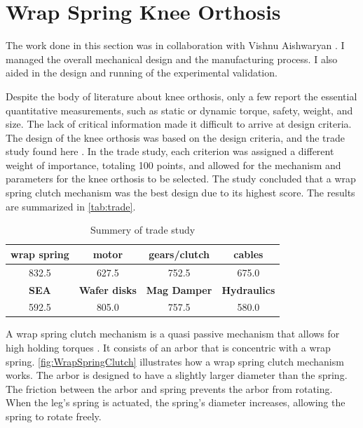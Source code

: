 
\section{Wrap Spring Knee Orthosis}
\label{sec:knee}

The work done in this section was in collaboration with  Vishnu Aishwaryan \cite{mani2020design}. I managed the overall mechanical design and the manufacturing process. I also aided in the design and running of the experimental validation.

Despite the body of literature about knee orthosis, only a few report the essential quantitative measurements, such as static or dynamic torque, safety, weight, and size. The lack of critical information made it difficult to arrive at design criteria. The design of the knee orthosis was based on the design criteria, and the trade study found here \cite{subra2020design}. In the trade study, each criterion was assigned a different weight of importance, totaling 100 points, and allowed for the mechanism and parameters for the knee orthosis to be selected. The study concluded that a wrap spring clutch mechanism was the best design due to its highest score. The results are summarized in \autoref{tab:trade}.


\begin{table}[h!]
  \begin{center}
    \begin{tabular}{c|c|c|c} %
      \textbf{wrap spring} & \textbf{motor} & \textbf{gears/clutch} & \textbf{cables} \\
      \hline \hline
      832.5 & 627.5 & 752.5 & 675.0 \\
      \hline
      \textbf{SEA}  & \textbf{Wafer disks}  & \textbf{Mag Damper} & \textbf{Hydraulics} \\
      \hline \hline
      592.5 & 805.0 & 757.5 & 580.0\\
    \end{tabular}
  \end{center}
      \caption[Knee Trade Study]{Summery of trade study}
    \label{tab:trade}
\end{table}


A wrap spring clutch mechanism is a quasi passive mechanism that allows for high holding torques \cite{irby1999optimization} \cite{tung2013design}. It consists of an arbor that is concentric with a wrap spring. \autoref{fig:WrapSpringClutch} illustrates how a wrap spring clutch mechanism works. The arbor is designed to have a slightly larger diameter than the spring. The friction between the arbor and spring prevents the arbor from rotating. When the leg's spring is actuated, the spring's diameter increases, allowing the spring to rotate freely. 

